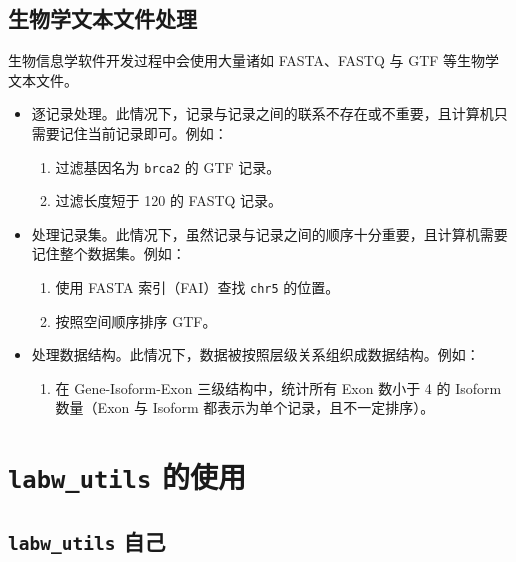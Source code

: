 \documentclass[pdf,9pt]{beamer}
\newcommand{\lu}{\texttt{labw\_utils}}
\begin{document}
    \subsection{生物学文本文件处理}

    \begin{frame}{\subsecname}
        生物信息学软件开发过程中会使用大量诸如 FASTA、FASTQ 与 GTF 等生物学文本文件。

        \begin{itemize}
            \item 逐记录处理。此情况下，记录与记录之间的联系不存在或不重要，且计算机只需要记住当前记录即可。例如：
            \begin{enumerate}
                \item 过滤基因名为 \Verb|brca2| 的 GTF 记录。
                \item 过滤长度短于 120 的 FASTQ 记录。
            \end{enumerate}
            \item 处理记录集。此情况下，虽然记录与记录之间的顺序十分重要，且计算机需要记住整个数据集。例如：
            \begin{enumerate}
                \item 使用 FASTA 索引（FAI）查找 \Verb|chr5| 的位置。
                \item 按照空间顺序排序 GTF。
            \end{enumerate}
            \item 处理数据结构。此情况下，数据被按照层级关系组织成数据结构。例如：
            \begin{enumerate}
                \item 在 Gene-Isoform-Exon 三级结构中，统计所有 Exon 数小于 4 的 Isoform 数量（Exon 与 Isoform 都表示为单个记录，且不一定排序）。
            \end{enumerate}
        \end{itemize}
    \end{frame}

    \section{\lu{} 的使用}

    \begin{frame}
        \sectionpage
    \end{frame}

    \subsection{\lu{} 自己}
\end{document}
